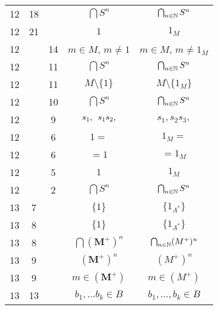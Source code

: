 \documentclass[a4paper,11pt]{article}
\begin{document}
\begin{center}
\begin{tabular}{|c|c|c|c|c|}
    12 & 18 & & $\bigcap S^{ n }$ & $\bigcap_{ n \in \mathbb{N} } S^{ n }$ \\
    12 & 21 & & $1$ & $1_{ M }$ \\
    12 & & 14 & $m \in M$,{ } $m \neq 1$ & $m \in M$, $m \neq 1_{ M }$ \\
    12 & & 11 & $\bigcap S^{ n }$ & $\bigcap_{ n \in \mathbb{N} } S^{ n }$  \\
    12 & & 11 & $M \setminus \{ 1 \} $ & $M \setminus \{ 1_{ M } \} $ \\
    12 & & 10 & $\bigcap S^{ n }$ & $\bigcap_{ n \in \mathbb{N} } S^{ n }$ \\
    12 & &  9 & $s_{ 1 }, \hspace{0.5em} s_{ 1 } s_{ 2 },$
           & $s_{ 1 }, s_{ 2 } s_{ 3 },$ \\
    12 & &  6 & $1 =$ & $1_{ M } =$ \\
    12 & &  6 & $= 1$ & $= 1_{ M }$ \\
    12 & &  5 & $1$ & $1_{ M }$ \\
    12 & &  2 & $\bigcap S^{ n }$ & $\bigcap_{ n \in \mathbb{N} } S^{ n }$ \\
    13 &  7 & & $\{ 1 \}$ & $\{ 1_{ A^{ * } } \}$ \\
    13 &  8 & & $\{ 1 \}$ & $\{ 1_{ A^{ * } } \}$ \\
    13 &  8 & & $\bigcap ( \mathbf{M}^{ + } )^{ n }$
           & $\bigcap_{ n \in \mathbb{N} } ( M^{ + } )^{ n }$ \\
    13 &  9 & & $( \mathbf{M}^{ + } )^{ n }$ & $( M^{ + } )^{ n }$ \\
    13 &  9 & & $m \in ( \mathbf{M}^{ + } )$ & $m \in ( M^{ + } )$ \\
    13 & 13 & & $b_{ 1 }, \ldots b_{ k } \in B$ & $b_{ 1 }, \ldots, b_{ k } \in B$ \\
    \hline
  \end{tabular}





  \newpage


\end{center}
\end{document}
